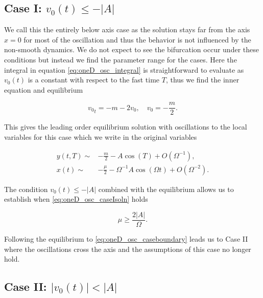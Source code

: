 \subsection{Case I: $v_0(t) \le -|A|$}
\label{subsec:oneD_osc_CaseI}

We call this the entirely below axis case as the solution stays far from the axis $x=0$ for most of the oscillation and thus the behavior is not influenced by the non-smooth dynamics. We do not expect to see the bifurcation occur under these conditions but instead we find the parameter range for the cases. Here the integral in equation \eqref{eq:oneD_osc_integral} is straightforward to evaluate as $v_0(t)$ is a constant with respect to the fast time $T$, thus we find the inner equation and equilibrium

\begin{equation*}
{v_0}_t=-m-2v_0,\quad v_0=-\frac{m}{2}.
\end{equation*}

This gives the leading order equilibrium solution with oscillations to the local variables for this case which we write in the original variables

\begin{equation}\label{eq:oneD_osc_caseIsoln}
\begin{aligned}
y(t,T)\sim& -\frac{m}{2}-A\cos(T)+O(\Omega^{-1}),\\ 
x(t)\sim& -\frac{\mu}{2}-\Omega^{-1} A\cos(\Omega t)+O(\Omega^{-2}).
\end{aligned}
\end{equation}

The condition $v_0(t)\le -|A|$ combined with the equilibrium allows us to establish when \eqref{eq:oneD_osc_caseIsoln} holds

\begin{equation}\label{eq:oneD_osc_caseboundary}
\mu\ge \frac{2|A|}{\Omega}.
\end{equation}

Following the equilibrium to \eqref{eq:oneD_osc_caseboundary} leads us to Case II where the oscillations cross the axis and the assumptions of this case no longer hold.

\subsection{Case II: $|v_0(t)|< |A|$}
\label{subsec:oneD_osc_CaseII}

